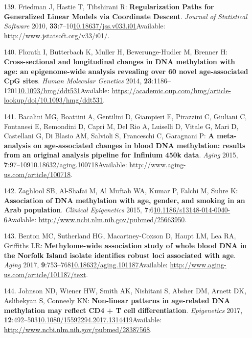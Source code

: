 \documentclass[
]{book}
\begin{document}
\leavevmode\hypertarget{ref-Friedman2010}{}%
139. Friedman J, Hastie T, Tibshirani R: \textbf{Regularization Paths for Generalized Linear Models via Coordinate Descent}. \emph{Journal of Statistical Software} 2010, \textbf{33}:7--10\href{https://doi.org/10.18637/jss.v033.i01}{10.18637/jss.v033.i01}Available: \url{http://www.jstatsoft.org/v33/i01/}.

\leavevmode\hypertarget{ref-Florath2014}{}%
140. Florath I, Butterbach K, Muller H, Bewerunge-Hudler M, Brenner H: \textbf{Cross-sectional and longitudinal changes in DNA methylation with age: an epigenome-wide analysis revealing over 60 novel age-associated CpG sites}. \emph{Human Molecular Genetics} 2014, \textbf{23}:1186--1201\href{https://doi.org/10.1093/hmg/ddt531}{10.1093/hmg/ddt531}Available: \url{https://academic.oup.com/hmg/article-lookup/doi/10.1093/hmg/ddt531}.

\leavevmode\hypertarget{ref-Bacalini2015}{}%
141. Bacalini MG, Boattini A, Gentilini D, Giampieri E, Pirazzini C, Giuliani C, Fontanesi E, Remondini D, Capri M, Del Rio A, Luiselli D, Vitale G, Mari D, Castellani G, Di Blasio AM, Salvioli S, Franceschi C, Garagnani P: \textbf{A meta-analysis on age-associated changes in blood DNA methylation: results from an original analysis pipeline for Infinium 450k data}. \emph{Aging} 2015, \textbf{7}:97--109\href{https://doi.org/10.18632/aging.100718}{10.18632/aging.100718}Available: \url{http://www.aging-us.com/article/100718}.

\leavevmode\hypertarget{ref-Zaghlool2015}{}%
142. Zaghlool SB, Al-Shafai M, Al Muftah WA, Kumar P, Falchi M, Suhre K: \textbf{Association of DNA methylation with age, gender, and smoking in an Arab population}. \emph{Clinical Epigenetics} 2015, \textbf{7}:6\href{https://doi.org/10.1186/s13148-014-0040-6}{10.1186/s13148-014-0040-6}Available: \url{http://www.ncbi.nlm.nih.gov/pubmed/25663950}.

\leavevmode\hypertarget{ref-Benton2017}{}%
143. Benton MC, Sutherland HG, Macartney-Coxson D, Haupt LM, Lea RA, Griffiths LR: \textbf{Methylome-wide association study of whole blood DNA in the Norfolk Island isolate identifies robust loci associated with age}. \emph{Aging} 2017, \textbf{9}:753--768\href{https://doi.org/10.18632/aging.101187}{10.18632/aging.101187}Available: \url{http://www.aging-us.com/article/101187/text}.

\leavevmode\hypertarget{ref-Johnson2017}{}%
144. Johnson ND, Wiener HW, Smith AK, Nishitani S, Absher DM, Arnett DK, Aslibekyan S, Conneely KN: \textbf{Non-linear patterns in age-related DNA methylation may reflect CD4 + T cell differentiation}. \emph{Epigenetics} 2017, \textbf{12}:492--503\href{https://doi.org/10.1080/15592294.2017.1314419}{10.1080/15592294.2017.1314419}Available: \url{http://www.ncbi.nlm.nih.gov/pubmed/28387568}.
\end{document}
